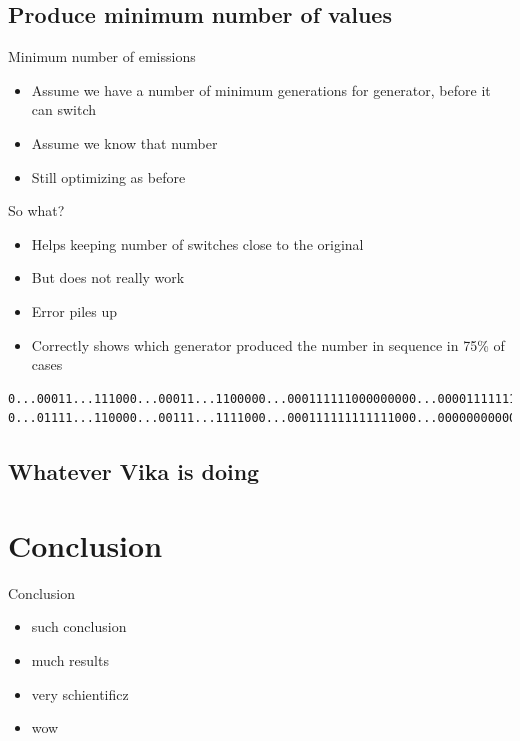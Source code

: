 \documentclass[hyperref=unicode,graphics=pdflatex,13pt]{beamer}
\begin{document}
\subsection{Produce minimum number of values}
\begin{frame}{Minimum number of emissions}
 \begin{itemize}
  \item Assume we have a number of minimum generations for generator, before it can switch
  \item Assume we know that number
  \item Still optimizing as before
 \end{itemize}
\end{frame}

\begin{frame}[fragile]{So what?}
 \begin{itemize}
  \item Helps keeping number of switches close to the original
  \item But does not really work
\item Error piles up
\item Correctly shows which generator produced the number in sequence in 75\% of cases
 \end{itemize}

 \tiny\begin{lstlisting}
0...00011...111000...00011...1100000...000111111000000000...0000111111111
0...01111...110000...00111...1111000...000111111111111000...0000000000001
 \end{lstlisting}
\end{frame}

\subsection{Whatever Vika is doing}

\section{Conclusion} %

\begin{frame}{Conclusion}
 \begin{itemize}
  \item such conclusion
  \item much results
  \item very schientificz
  \item wow
 \end{itemize}

\end{frame}
\end{document}
